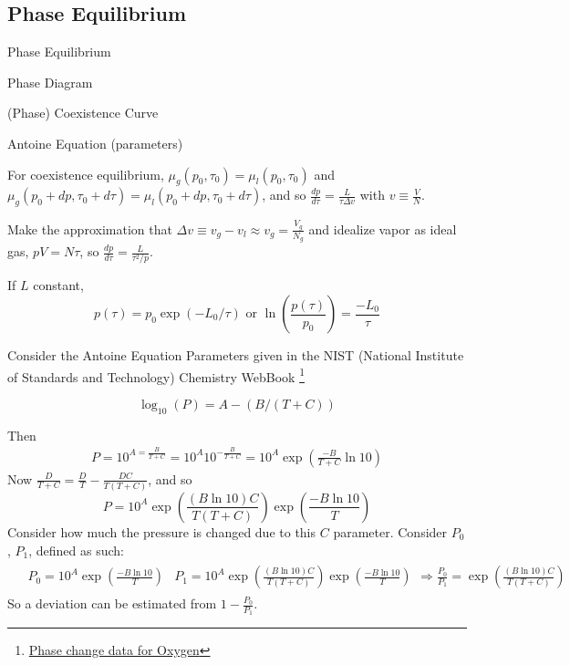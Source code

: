 \documentclass[10pt]{amsart}
\begin{document}
\begin{multicols*}{2}
\section{Phase Equilibrium}


\begin{description}
\item Phase Equilibrium
\item Phase Diagram
\item (Phase) Coexistence Curve 
\item Antoine Equation (parameters)
\end{description}


For coexistence equilibrium, $\mu_g(p_0,\tau_0) = \mu_l(p_0,\tau_0)$ and $\mu_g(p_0 + dp, \tau_0 + d\tau) = \mu_l(p_0 + dp, \tau_0+d\tau)$, and so $\frac{dp}{d\tau} = \frac{L}{ \tau \Delta v}$ with $v \equiv \frac{V}{N}$.  

Make the approximation that $\Delta v \equiv v_g - v_l \approx v_g = \frac{V_g}{N_g}$ and idealize vapor as ideal gas, $pV = N\tau$, so $\frac{dp}{d\tau} = \frac{L}{\tau^2/p}$.  

If $L$ constant, 
\begin{equation}
p(\tau) = p_0 \exp{ (-L_0 /\tau)} \text{ or } \ln{ \left( \frac{p(\tau)}{p_0} \right) } = \frac{-L_0}{\tau}
\end{equation}

Consider the Antoine Equation Parameters given in the NIST (National Institute of Standards and Technology) Chemistry WebBook \footnote{\href{http://webbook.nist.gov/cgi/cbook.cgi?ID=C7782447&Mask=4\#Thermo-Phase}{Phase change data for Oxygen}}

\begin{equation}
  \log_{10}(P) = A- (B/(T+C))
\end{equation}

Then
\[
\begin{gathered}
  P = 10^{ A = \frac{B}{T+C}} = 10^A 10^{-\frac{B}{T+C}} = 10^A \exp{ \left( \frac{-B}{T+C} \ln{10} \right) }
\end{gathered}
\]
Now $\frac{D}{T+C} = \frac{D}{T} - \frac{DC}{T(T+C)}$, and so
\[
P = 10^A \exp{ \left( \frac{ (B\ln{10} )C }{T(T+C)} \right) }\exp{ \left( \frac{-B\ln{10} }{ T} \right) }
\]
Consider how much the pressure is changed due to this $C$ parameter.  Consider $P_0$, $P_1$, defined as such:
\[
\begin{gathered}
  \begin{aligned}
    & P_0 = 10^A  \exp{ \left( \frac{-B\ln{10} }{ T} \right) }
    & P_1 = 10^A \exp{ \left( \frac{ (B\ln{10} )C }{T(T+C)} \right) }\exp{ \left( \frac{-B\ln{10} }{ T} \right) }
  \end{aligned} \Longrightarrow \frac{P_0}{P_1} = \exp{ \left( \frac{ (B\ln{10} )C }{ T(T+C) } \right)}
\end{gathered}
\]
So a deviation can be estimated from $1 - \frac{P_0}{P_1}$.  


\end{multicols*}
\end{document}
